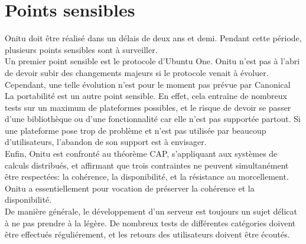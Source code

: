 \section{Points sensibles}
Onitu doit être réalisé dans un délais de deux ans et demi. Pendant cette période, plusieurs points sensibles sont à surveiller.\\

Un premier point sensible est le protocole d'Ubuntu One. Onitu n'est pas à l'abri de devoir subir des changements majeurs si le protocole venait à évoluer. Cependant, une telle évolution n'est pour le moment pas prévue par Canonical\\

La portabilité est un autre point sensible. En effet, cela entraîne de nombreux tests sur un maximum de plateformes possibles, et le risque de devoir se passer d'une bibliothèque ou d'une fonctionnalité car elle n'est pas supportée partout. Si une plateforme pose trop de problème et n'est pas utilisée par beaucoup d'utilisateurs, l'abandon de son support est à envisager.\\

Enfin, Onitu est confronté au théorème CAP, s'appliquant aux systèmes de calculs distribués, et affirmant que trois contraintes ne peuvent simultanément être respectées: la cohérence, la disponibilité, et la résistance au morcellement. Onitu a essentiellement pour vocation de préserver la cohérence et la disponibilité.\\

De manière générale, le développement d'un serveur est toujours un sujet délicat à ne pas prendre à la légère. De nombreux tests de différentes catégories doivent être effectués réguliérement, et les retours des utilisateurs doivent être écoutés.
